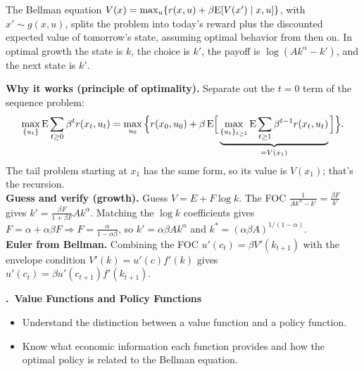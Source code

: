\documentclass[11pt]{article}
\newcounter{qn}
\newcommand{\question}[1]{\par\needspace{14\baselineskip}\refstepcounter{qn}\medskip
{\bfseries\color{ink}\large \theqn.\ #1}\par\smallskip}
\begin{document}
\begin{resp}
The Bellman equation $V(x)=\max_u\{r(x,u)+\beta\mathrm{E}[V(x')\mid x,u]\}$, with $x'\sim g(x,u)$, splits the problem into today's reward plus the discounted expected value of tomorrow's state, assuming optimal behavior from then on. In optimal growth the state is $k$, the choice is $k'$, the payoff is $\log(Ak^\alpha-k')$, and the next state is $k'$.
\end{resp}
\begin{intu}
\textbf{Why it works (principle of optimality).} Separate out the $t=0$ term of the sequence problem:
\[\max_{\{u_t\}}\mathrm{E}\sum_{t\ge0}\beta^tr(x_t,u_t)=\max_{u_0}\Big\{r(x_0,u_0)+\beta\,\mathrm{E}\Big[\underbrace{\max_{\{u_t\}_{t\ge1}}\mathrm{E}\sum_{t\ge1}\beta^{t-1}r(x_t,u_t)}_{=V(x_1)}\Big]\Big\}.\]
The tail problem starting at $x_1$ has the same form, so its value is $V(x_1)$; that's the recursion.\\
\textbf{Guess and verify (growth).} Guess $V=E+F\log k$. The FOC $\frac{1}{Ak^\alpha-k'}=\frac{\beta F}{k'}$ gives $k'=\frac{\beta F}{1+\beta F}Ak^\alpha$. Matching the $\log k$ coefficients gives $F=\alpha+\alpha\beta F\Rightarrow F=\frac{\alpha}{1-\alpha\beta}$, so $k'=\alpha\beta Ak^\alpha$ and $k^*=(\alpha\beta A)^{1/(1-\alpha)}$.\\
\textbf{Euler from Bellman.} Combining the FOC $u'(c_t)=\beta V'(k_{t+1})$ with the envelope condition $V'(k)=u'(c)f'(k)$ gives $u'(c_t)=\beta u'(c_{t+1})f'(k_{t+1})$.
\end{intu}

\question{Value Functions and Policy Functions}
\begin{itemize}[leftmargin=1.2em,itemsep=0pt]\itshape
\item Understand the distinction between a value function and a policy function.
\item Know what economic information each function provides and how the optimal policy is related to the Bellman equation.
\end{itemize}
\end{document}
